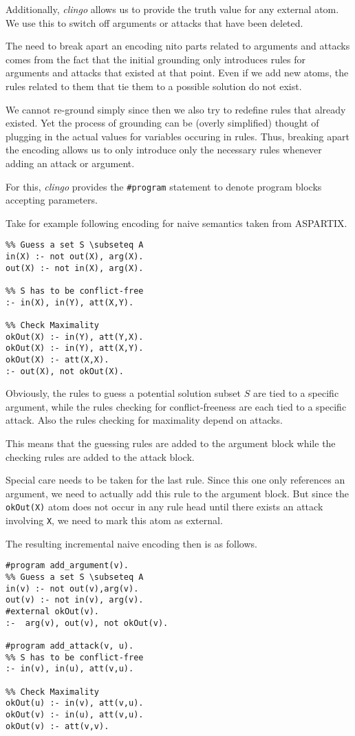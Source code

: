 \documentclass[oneside,12pt]{amsart}
\begin{document}
Additionally, \emph{clingo} allows us to provide the truth value for any external atom. 
We use this to switch off arguments or attacks that have been deleted.

The need to break apart an encoding nito parts related to arguments and attacks 
comes from the fact that the initial grounding only introduces rules for 
arguments and attacks that existed at that point. 
Even if we add new atoms, the rules related to them that tie them to 
a possible solution do not exist.

We cannot re-ground simply since then we also try to redefine rules 
that already existed. Yet the process of grounding can be 
(overly simplified) thought of plugging in the actual values for variables occuring 
in rules. Thus, breaking apart the encoding allows us to only introduce 
only the necessary rules whenever adding an attack or argument.

For this, \emph{clingo} provides the \texttt{\#program} statement to 
denote program blocks accepting parameters. 

Take for example following encoding for naive semantics taken from ASPARTIX.
\begin{algobox}
\begin{lstlisting}
%% Guess a set S \subseteq A
in(X) :- not out(X), arg(X).
out(X) :- not in(X), arg(X).

%% S has to be conflict-free
:- in(X), in(Y), att(X,Y).

%% Check Maximality
okOut(X) :- in(Y), att(Y,X).
okOut(X) :- in(Y), att(X,Y).
okOut(X) :- att(X,X).
:- out(X), not okOut(X).
\end{lstlisting}
\end{algobox}

Obviously, the rules to guess a potential solution subset $S$ are tied 
to a specific argument, while the rules checking for conflict-freeness
are each tied to a specific attack. Also the rules checking for maximality 
depend on attacks.

This means that the guessing rules are added to the argument block
while the checking rules are added to the attack block.

Special care needs to be taken for the last rule. Since this one only references 
an argument, we need to actually add this rule to the argument block.
But since the \texttt{okOut(X)} atom does not occur in any rule head until 
there exists an attack involving \texttt{X}, we need to mark this atom as external.

The resulting incremental naive encoding then is as follows.
\begin{algobox}
\begin{lstlisting}
#program add_argument(v).
%% Guess a set S \subseteq A
in(v) :- not out(v),arg(v).
out(v) :- not in(v), arg(v).
#external okOut(v).
:-  arg(v), out(v), not okOut(v).

#program add_attack(v, u).
%% S has to be conflict-free
:- in(v), in(u), att(v,u).

%% Check Maximality
okOut(u) :- in(v), att(v,u).
okOut(v) :- in(u), att(v,u).
okOut(v) :- att(v,v).
\end{lstlisting}
\end{algobox}
\end{document}
